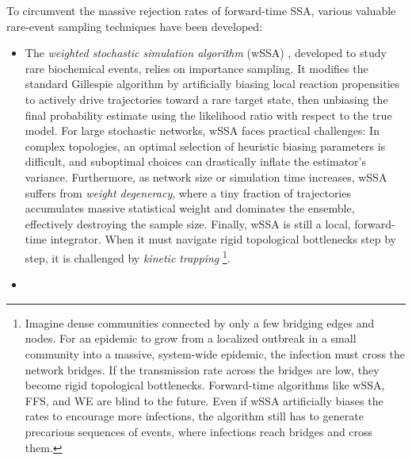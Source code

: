 \documentclass[english,10pt,aps,pra,twocolumn,superscriptaddress,floatfix,fleqn]{revtex4-2}
\begin{document}
To circumvent the massive rejection rates of forward-time SSA, various valuable rare-event sampling techniques have been developed:
\begin{itemize}
 \item
 The \emph{weighted stochastic simulation algorithm} (wSSA) \cite{Kuwahara2008-129,Gillespie2009-130}, developed to study rare biochemical events, relies on importance sampling. It modifies the standard Gillespie algorithm by artificially biasing local reaction propensities to actively drive trajectories toward a rare target state, then unbiasing the final probability estimate using the likelihood ratio with respect to the true model. For large stochastic networks, wSSA faces practical challenges: In complex topologies, an optimal selection of heuristic biasing parameters is difficult, and suboptimal choices can drastically inflate the estimator's variance. Furthermore, as network size or simulation time increases, wSSA suffers from \emph{weight degeneracy}, where a tiny fraction of trajectories accumulates massive statistical weight and dominates the ensemble, effectively destroying the sample size. Finally, wSSA is still a local, forward-time integrator. When it must navigate rigid topological bottlenecks step by step, it is challenged by \emph{kinetic trapping} \footnote{Imagine dense communities connected by only a few bridging edges and nodes. For an epidemic to grow from a localized outbreak in a small community into a massive, system-wide epidemic, the infection must cross the network bridges. If the transmission rate across the bridges are low, they become rigid topological bottlenecks. Forward-time algorithms like wSSA, FFS, and WE are blind to the future. Even if wSSA artificially biases the rates to encourage more infections, the algorithm still has to generate precarious sequences of events, where infections reach bridges and cross them.}.
 \item

\end{itemize}
\end{document}
